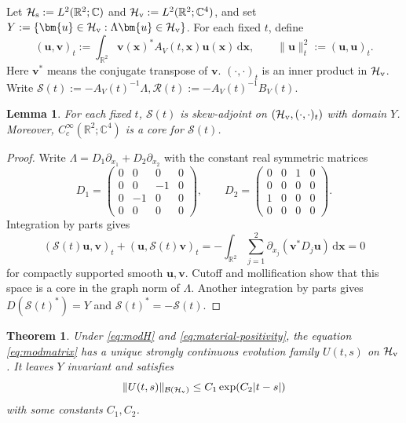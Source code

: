 \documentclass[11pt,reqno]{amsart}
\newtheorem{lemma}{Lemma}[section]
\newtheorem{theorem}{Theorem}[section]
\newcommand{\dd}{\,\mathrm{d}}
\numberwithin{equation}{section}
\begin{document}
Let $\mathcal H_{\rm s}:=L^2(\mathbb R^2;\mathbb C)$ and $\mathcal H_{\rm v}:=L^2(\mathbb R^2;\mathbb C^4)$, and set $Y:=\{\bm{u}\in\mathcal H_{\rm v}:\Lambda \bm{u}\in\mathcal H_{\rm v}\}$. For each fixed $t$, define
\begin{equation}\label{eq:movingnorm}
(\bm{u},\bm{v})_t:=\int_{\mathbb R^2}\bm{v}(\bm{x})^*A_V(t,\bm{x})\bm{u}(\bm{x})\dd \bm{x},
\qquad
\|\bm{u}\|_t^2:=(\bm{u},\bm{u})_t.
\end{equation}
Here $\bm{v}^*$ means the conjugate transpose of $\bm{v}$. $(\cdot,\cdot)_t$ is an inner product in $\mathcal H_{\rm v}$. Write $\mathcal S(t):=-A_V(t)^{-1}\Lambda, \mathcal R(t):=-A_V(t)^{-1}B_V(t)$.

\begin{lemma}\label{lem:skew} 
For each fixed $t$, $\mathcal S(t)$ is skew-adjoint on $(\mathcal H_{\rm v},(\cdot,\cdot)_t)$ with domain $Y$. Moreover, $C_c^\infty(\mathbb R^2;\mathbb C^4)$ is a core for $\mathcal S(t)$. 
\end{lemma}

\begin{proof} 
Write $\Lambda=D_1\partial_{x_1}+D_2\partial_{x_2}$ with the constant real symmetric matrices 
\begin{equation*}
D_1=
\begin{pmatrix}
0 & 0 & 0 & 0\\
0 & 0 & -1 & 0\\
0 & -1 & 0 & 0\\
0 & 0 & 0 & 0
\end{pmatrix},
\qquad
D_2=
\begin{pmatrix}
0 & 0 & 1 & 0\\
0 & 0 & 0 & 0\\
1 & 0 & 0 & 0\\
0 & 0 & 0 & 0
\end{pmatrix}.
\end{equation*}
Integration by parts gives
$$
(\mathcal S(t)\bm{u},\bm{v})_t+(\bm{u},\mathcal S(t)\bm{v})_t = -\int_{\mathbb R^2}\sum_{j=1}^2 \partial_{x_j}(\bm{v}^*D_j\bm{u})\dd \bm{x} = 0
$$
for compactly supported smooth $\bm{u},\bm{v}$. Cutoff and mollification show that this space is a core in the graph norm of $\Lambda$. Another integration by parts gives $D(\mathcal S(t)^*)=Y$ and $\mathcal S(t)^*=-\mathcal S(t)$. 
\end{proof}

\begin{theorem} 
Under \eqref{eq:modH} and \eqref{eq:material-positivity}, the equation \eqref{eq:modmatrix} has a unique strongly continuous evolution family $U(t,s)$ on $\mathcal H_{\rm v}$. It leaves $Y$ invariant and satisfies
\begin{equation}\label{eq:modUbound}
\|U(t,s)\|_{\mathcal B(\mathcal H_{\rm v})}\le C_1\exp(C_2|t-s|)
\end{equation}
with some constants $C_1, C_2$.
\end{theorem}
\end{document}
